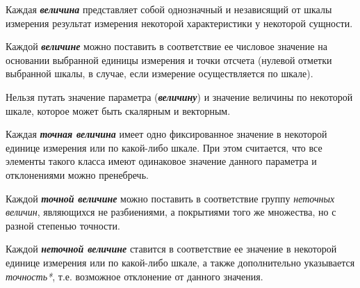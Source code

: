 Каждая \textbf{\textit{величина}} представляет собой однозначный и независящий от шкалы измерения результат измерения некоторой характеристики у некоторой сущности.
		
Каждой \textbf{\textit{величине}} можно поставить в соответствие ее числовое значение на основании выбранной единицы измерения и точки отсчета (нулевой отметки выбранной шкалы, в случае, если измерение осуществляется по шкале).
		
Нельзя путать значение параметра (\textbf{\textit{величину}}) и значение величины по некоторой шкале, которое может быть скалярным и векторным.
	
\begin{SCn}
\end{SCn}

Каждая \textbf{\textit{точная величина}} имеет одно фиксированное значение в некоторой единице измерения или по какой-либо шкале. При этом считается, что все элементы такого класса имеют одинаковое значение данного параметра и отклонениями можно пренебречь.
		
Каждой \textbf{\textit{точной величине}} можно поставить в соответствие группу \textit{неточных величин}, являющихся не разбиениями, а покрытиями того же множества, но с разной степенью точности.
\begin{SCn}
\end{SCn}

Каждой \textbf{\textit{неточной величине}} ставится в соответствие ее значение в некоторой единице измерения или по какой-либо шкале, а также дополнительно указывается \textit{точность*}, т.е. возможное отклонение от данного значения.
\begin{SCn}
\end{SCn}

